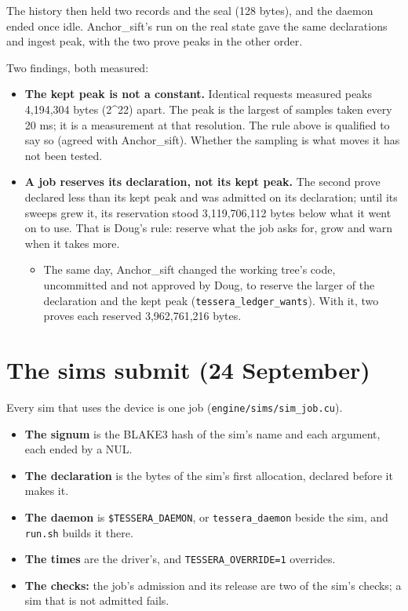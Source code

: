 The history then held two records and the seal (128 bytes), and the daemon ended once idle. Anchor\_\allowbreak{}sift's run on the real state gave the same declarations and ingest peak, with the two prove peaks in the other order.

Two findings, both measured:

\begin{itemize}
\item \textbf{The kept peak is not a constant.} Identical requests measured peaks 4,194,304 bytes (2\textasciicircum{}22) apart. The peak is the largest of samples taken every 20 ms; it is a measurement at that resolution. The rule above is qualified to say so (agreed with Anchor\_\allowbreak{}sift). Whether the sampling is what moves it has not been tested.
\item \textbf{A job reserves its declaration, not its kept peak.} The second prove declared less than its kept peak and was admitted on its declaration; until its sweeps grew it, its reservation stood 3,119,706,112 bytes below what it went on to use. That is Doug's rule: reserve what the job asks for, grow and warn when it takes more.

\begin{itemize}
\item The same day, Anchor\_\allowbreak{}sift changed the working tree's code, uncommitted and not approved by Doug, to reserve the larger of the declaration and the kept peak (\texttt{tessera\_\allowbreak{}ledger\_\allowbreak{}wants}). With it, two proves each reserved 3,962,761,216 bytes.
\end{itemize}
\end{itemize}

\section{\texorpdfstring{The sims submit (24 September)}{The sims submit (24 September)}}

Every sim that uses the device is one job (\texttt{engine/\allowbreak{}sims/\allowbreak{}sim\_\allowbreak{}job.\allowbreak{}cu}).

\begin{itemize}
\item \textbf{The signum} is the BLAKE3 hash of the sim's name and each argument, each ended by a NUL.
\item \textbf{The declaration} is the bytes of the sim's first allocation, declared before it makes it.
\item \textbf{The daemon} is \texttt{\$TESSERA\_\allowbreak{}DAEMON}, or \texttt{tessera\_\allowbreak{}daemon} beside the sim, and \texttt{run.\allowbreak{}sh} builds it there.
\item \textbf{The times} are the driver's, and \texttt{TESSERA\_\allowbreak{}OVERRIDE=1} overrides.
\item \textbf{The checks:} the job's admission and its release are two of the sim's checks; a sim that is not admitted fails.
\end{itemize}

